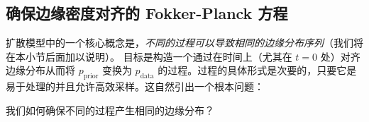 \subsection{确保边缘密度对齐的 Fokker-Planck 方程}
扩散模型中的一个核心概念是，\emph{不同的过程可以导致相同的边缘分布序列}（我们将在本小节后面加以说明）。
 目标是构造一个通过在时间上（尤其在 $t=0$ 处）对齐边缘分布从而将 $p_{\mathrm{prior}}$ 变换为 $p_{\mathrm{data}}$ 的过程。过程的具体形式是次要的，只要它是易于处理的并且允许高效采样。这自然引出一个根本问题：


\begin{question}
我们如何确保不同的过程产生相同的边缘分布？
\end{question}



